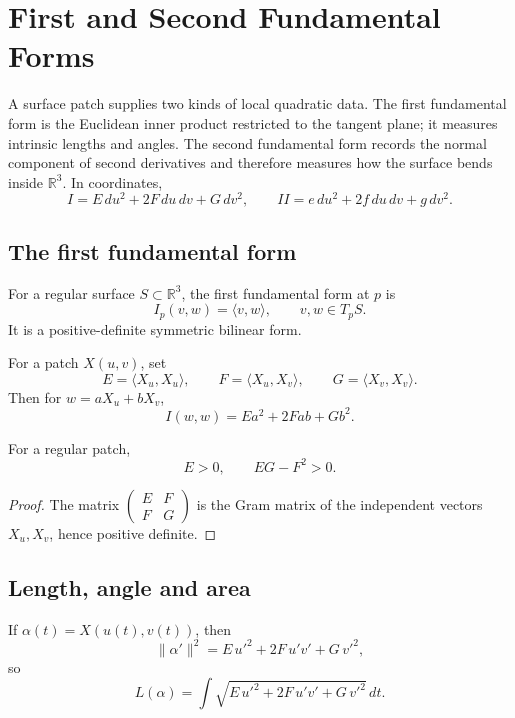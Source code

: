 \chapter{First and Second Fundamental Forms}
\label{ch:vii15-first-and-second-fundamental-forms}

A surface patch supplies two kinds of local quadratic data.  The first fundamental form is the Euclidean inner product restricted to the tangent plane; it measures intrinsic lengths and angles.  The second fundamental form records the normal component of second derivatives and therefore measures how the surface bends inside \(\mathbb R^3\).  In coordinates,
\[
\boxed{I=E\,du^2+2F\,du\,dv+G\,dv^2,\qquad
II=e\,du^2+2f\,du\,dv+g\,dv^2.}
\]

\section{The first fundamental form}
\begin{definition}\label{def:vii15-first-form}
For a regular surface \(S\subset\mathbb R^3\), the first fundamental form at \(p\) is
\[
I_p(v,w)=\langle v,w\rangle,\qquad v,w\in T_pS.
\]
It is a positive-definite symmetric bilinear form.
\end{definition}

\begin{definition}\label{def:vii15-EFG}
For a patch \(X(u,v)\), set
\[
E=\langle X_u,X_u\rangle,\qquad
F=\langle X_u,X_v\rangle,\qquad
G=\langle X_v,X_v\rangle.
\]
Then for \(w=aX_u+bX_v\),
\[
I(w,w)=Ea^2+2Fab+Gb^2.
\]
\end{definition}

\begin{proposition}\label{prop:vii15-positive}
For a regular patch,
\[
E>0,\qquad EG-F^2>0.
\]
\end{proposition}
\begin{proof}
The matrix \(\begin{pmatrix}E&F\\F&G\end{pmatrix}\) is the Gram matrix of the independent vectors \(X_u,X_v\), hence positive definite.
\end{proof}

\section{Length, angle and area}
\begin{proposition}\label{prop:vii15-length}
If \(\alpha(t)=X(u(t),v(t))\), then
\[
\|\alpha'\|^2=E\,u'^2+2F\,u'v'+G\,v'^2,
\]
so
\[
L(\alpha)=\int\sqrt{E\,u'^2+2F\,u'v'+G\,v'^2}\,dt.
\]
\end{proposition}

